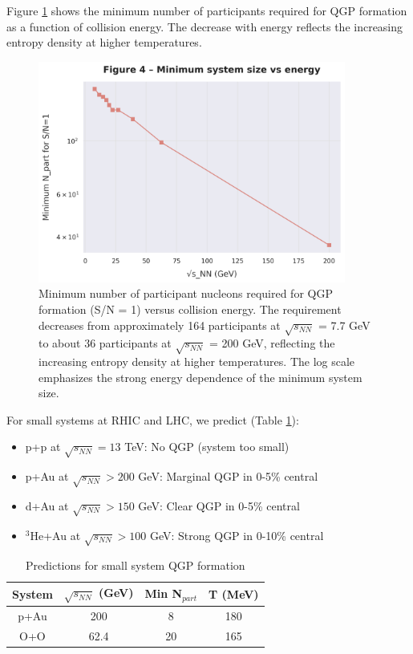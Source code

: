 \documentclass[12pt,a4paper]{article}
\begin{document}
Figure \ref{fig:min_system} shows the minimum number of participants required for QGP formation as a function of collision energy. The decrease with energy reflects the increasing entropy density at higher temperatures.

\begin{figure}[H]
\centering
\includegraphics[width=0.9\textwidth]{figures/figure4_min_system_size.png}
\caption{Minimum number of participant nucleons required for QGP formation (S/N = 1) versus collision energy. The requirement decreases from approximately 164 participants at $\sqrt{s_{NN}}$ = 7.7 GeV to about 36 participants at $\sqrt{s_{NN}}$ = 200 GeV, reflecting the increasing entropy density at higher temperatures. The log scale emphasizes the strong energy dependence of the minimum system size.}
\label{fig:min_system}
\end{figure}

For small systems at RHIC and LHC, we predict (Table \ref{tab:small_systems}):
\begin{itemize}
\item p+p at $\sqrt{s_{NN}} = 13$ TeV: No QGP (system too small)
\item p+Au at $\sqrt{s_{NN}} > 200$ GeV: Marginal QGP in 0-5\% central
\item d+Au at $\sqrt{s_{NN}} > 150$ GeV: Clear QGP in 0-5\% central
\item $^3$He+Au at $\sqrt{s_{NN}} > 100$ GeV: Strong QGP in 0-10\% central
\end{itemize}

\begin{table}[H]
\centering
\caption{Predictions for small system QGP formation}
\label{tab:small_systems}
\begin{tabular}{|c|c|c|c|}
\hline
System & $\sqrt{s_{NN}}$ (GeV) & Min N$_{part}$ & T (MeV) \\
\hline
p+Au & 200 & 8 & 180 \\
O+O & 62.4 & 20 & 165 \\
\hline
\end{tabular}
\end{table}
\end{document}
